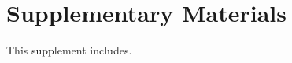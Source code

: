 \setcounter{table}{0}
\setcounter{figure}{0}
\renewcommand{\thetable}{S\arabic{chapter}.\arabic{table}}
\renewcommand{\thefigure}{S\arabic{chapter}.\arabic{figure}}
\newpage
\section*{Supplementary Materials}

This supplement includes.




\renewcommand{\thetable}{\arabic{table}}
\renewcommand{\thefigure}{\arabic{figure}}


